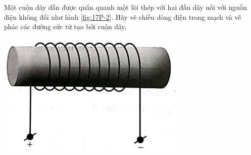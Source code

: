 \begin{ex}
	Một cuộn dây dẫn được quấn quanh một lõi thép với hai đầu dây nối với nguồn điện không đổi như hình \ref{fig:17P-2}. Hãy vẽ chiều dòng điện trong mạch và vẽ phác các đường sức từ tạo bởi cuộn dây.
	\begin{center}
		\includegraphics[width=0.3\linewidth]{../figs/VN12-Y24-PH-SYL-017P-2}
		\label{fig:17P-2}
	\end{center}
\end{ex}
